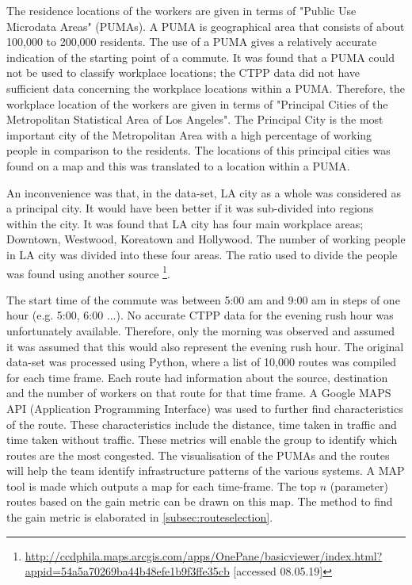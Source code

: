 The residence locations of the workers are given in terms of "Public Use Microdata Areas" (PUMAs). A PUMA is geographical area that consists of about 100,000 to 200,000 residents. The use of a PUMA gives a relatively accurate indication of the starting point of a commute. It was found that a PUMA could not be used to classify workplace locations; the CTPP data did not have sufficient data concerning the workplace locations within a PUMA. Therefore, the workplace location of the workers are given in terms of "Principal Cities of the Metropolitan Statistical Area of Los Angeles". The Principal City is the most important city of the Metropolitan Area with a high percentage of working people in comparison to the residents. The locations of this principal cities was found on a map and this was translated to a location within a PUMA.

An inconvenience was that, in the data-set, LA city as a whole was considered as a principal city. It would have been better if it was sub-divided into regions within the city. It was found that LA city has four main workplace areas; Downtown, Westwood, Koreatown and Hollywood. The number of working people in LA city was divided into these four areas. The ratio used to divide the people was found using another source \footnote{\url{http://ccdphila.maps.arcgis.com/apps/OnePane/basicviewer/index.html?appid=54a5a70269ba44b48efe1b9f3ffe35cb} [accessed 08.05.19]}.

The start time of the commute was between 5:00 am and 9:00 am in steps of one hour (e.g. 5:00, 6:00 ...). No accurate CTPP data for the evening rush hour was unfortunately available. Therefore, only the morning was observed and assumed it was assumed that this would also represent the evening rush hour. The original data-set was processed using Python, where a list of 10,000 routes was compiled for each time frame. Each route had information about the source, destination and the number of workers on that route for that time frame. A Google MAPS API (Application Programming Interface) was used to further find characteristics of the route. These characteristics include the distance, time taken in traffic and time taken without traffic. These metrics will enable the group to identify which routes are the most congested. The visualisation of the PUMAs and the routes will help the team identify infrastructure patterns of the various systems. A MAP tool is made which outputs a map for each time-frame. The top $n$ (parameter) routes based on the gain metric can be drawn on this map. The method to find the gain metric is elaborated in \autoref{subsec:routeselection}. 

